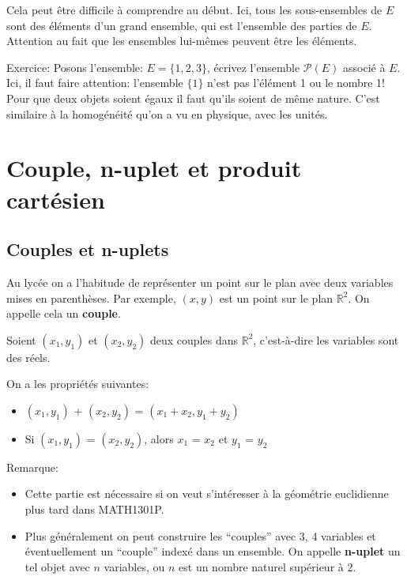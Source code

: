 \documentclass{article}
\begin{document}
Cela peut être difficile à comprendre au début. Ici, tous les sous-ensembles de $E$ sont des éléments d'un grand ensemble, qui est l'ensemble des parties de $E$. Attention au fait que les ensembles lui-mêmes peuvent être les éléments.

Exercice: Posons l'ensemble: $E = \{ 1, 2, 3\}$, écrivez l'ensemble $\mathcal{P}(E)$ associé à $E$. Ici, il faut faire attention: l'ensemble $\{1\}$ n'est pas l'élément 1 ou le nombre 1! Pour que deux objets soient égaux il faut qu'ils soient de même nature. C'est similaire à la homogénéité qu'on a vu en physique, avec les unités. 

\section{Couple, n-uplet et produit cartésien}

\subsection{Couples et n-uplets}

Au lycée on a l'habitude de représenter un point sur le plan avec deux variables mises en parenthèses. Par exemple, $(x,y)$ est un point sur le plan $\mathbb{R}^{2}$. On appelle cela un \textbf{couple}.

 \begin{tcolorbox}[colback=blue!5!white,colframe=blue!75!black,title=Propriété 2.3]

Soient $(x_{1},y_{1})$ et $(x_{2},y_{2})$ deux couples dans $\mathbb{R}^{2}$, c'est-à-dire les variables sont des réels.

On a les propriétés suivantes:
\begin{itemize}
 \item $(x_{1},y_{1})$ + $(x_{2},y_{2})$ = $(x_{1} + x_{2}, y_{1} + y_{2})$
 \item Si $(x_{1},y_{1})$ = $(x_{2},y_{2})$, alors $x_{1}$ = $x_{2}$ et $y_{1}$ = $y_{2}$
\end{itemize}

\end{tcolorbox} 

Remarque: 
\begin{itemize}
 \item Cette partie est nécessaire si on veut s'intéresser à la géométrie euclidienne plus tard dans MATH1301P.
 \item Plus généralement on peut construire les ``couples'' avec 3, 4 variables et éventuellement un ``couple'' indexé dans un ensemble. On appelle \textbf{n-uplet} un tel objet avec $n$ variables, ou $n$ est un nombre naturel supérieur à 2.
\end{itemize}
\end{document}
